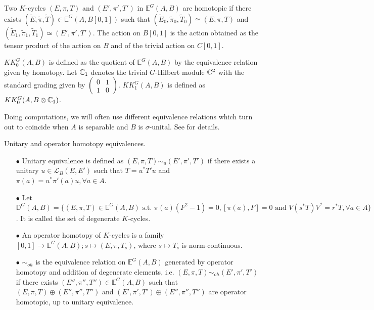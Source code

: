 \begin{definition}
Two $K$-cycles $(E,\pi,T)$ and $ (E',\pi',T')$ in $\mathbb E^G(A,B)$ are homotopic if there exists $ (\tilde E,\tilde \pi,\tilde T) \in\mathbb E^G(A,B[0,1])$ such that $(\tilde E_0,\tilde \pi_0,\tilde T_0)\simeq (E,\pi,T)$ and $(\tilde E_1,\tilde \pi_1,\tilde T_1)\simeq (E',\pi',T')$. The action on $B[0,1]$ is the action obtained as the tensor product of the action on $B$ and of the trivial action on $C[0,1]$.
\end{definition}

\begin{definition} $KK_0^G(A,B)$ is defined as the quotient of $\mathbb E^G(A,B)$ by the equivalence relation given by homotopy. Let $\mathbb C_1$ denotes the trivial $G$-Hilbert module $\mathbb C^2$ with the standard grading given by $\begin{pmatrix}0 & 1 \\ 1 & 0 \end{pmatrix}$. $KK_1^G(A,B)$ is defined as $KK_0^G(A,B \otimes \mathbb C_1)$. 
\end{definition}

Doing computations, we will often use different equivalence relations which turn out to coincide when $A$ is separable and $B$ is $\sigma$-unital. See \cite{blackadar} for details.

\begin{definition} Unitary and operator homotopy equivalences.
\begin{itemize}
\item[$\bullet$]  Unitary equivalence is defined as $(E,\pi,T)\sim_{u} (E',\pi',T')$ if there exists a unitary $u\in\mathcal L_B(E,E')$ such that $T = u^* T' u$ and $\pi(a) = u^* \pi'(a) u , \forall a\in A$.
\item[$\bullet$] Let $\mathbb D^G(A,B) = \{(E,\pi,T) \in\mathbb E^G(A,B) \text{ s.t. } \pi(a)(F^2-1) = 0, [\pi(a),F]=0 \text{ and }V(s^*T)V^* = r^*T,\forall a\in A \}$. It is called the set of degenerate $K$-cycles.   
\item[$\bullet$] An operator homotopy of $K$-cycles is a family $[0,1]\rightarrow \mathbb E^G(A,B) ; s\mapsto (E,\pi,T_s)$, where $s\mapsto T_s$ is norm-continuous. 
\item[$\bullet$] $\sim_{oh}$ is the equivalence relation on $\mathbb E^G(A,B)$ generated by operator homotopy and addition of degenerate elements, i.e. $(E,\pi,T)\sim_{oh} (E',\pi',T')$ if there exists $(E'',\pi'',T'')\in\mathbb E^{G}(A,B)$ such that $(E,\pi,T)\oplus (E'',\pi'',T'')$ and $(E',\pi',T')\oplus (E'',\pi'',T'')$ are operator homotopic, up to unitary equivalence.
\end{itemize}
\end{definition}

